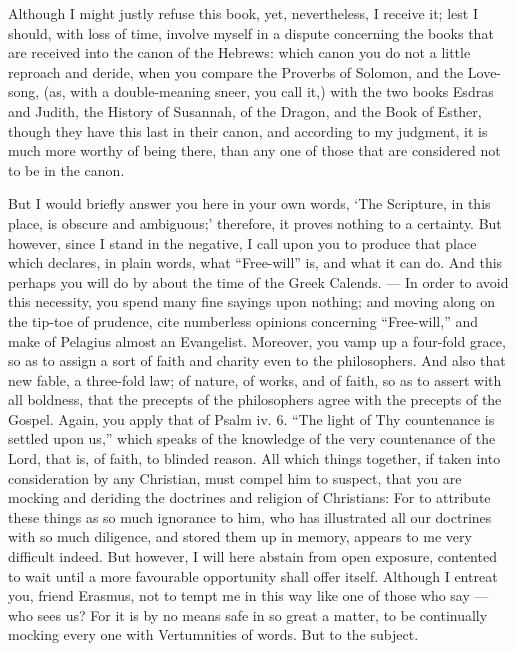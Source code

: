 Although I might justly refuse this book, yet, nevertheless, I receive it; lest I should, with loss of time, involve myself in a dispute concerning the books that are received into the canon of the Hebrews: which canon you do not a little reproach and deride, when you compare the Proverbs of Solomon, and the Love-song, (as, with a double-meaning sneer, you call it,) with the two books Esdras and Judith, the History of Susannah, of the Dragon, and the Book of Esther, though they have this last in their canon, and according to my judgment, it is much more worthy of being there, than any one of those that are considered not to be in the canon.

But I would briefly answer you here in your own words, ‘The Scripture, in this place, is obscure and ambiguous;’ therefore, it proves nothing to a certainty. But however, since I stand in the negative, I call upon you to produce that place which declares, in plain words, what “Free-will” is, and what it can do. And this perhaps you will do by about the time of the Greek Calends. — In order to avoid this necessity, you spend many fine sayings upon nothing; and moving along on the tip-toe of prudence, cite numberless opinions concerning “Free-will,” and make of Pelagius almost an Evangelist. Moreover, you vamp up a four-fold grace, so as to assign a sort of faith and charity even to the philosophers. And also that new fable, a three-fold law; of nature, of works, and of faith, so as to assert with all boldness, that the precepts of the philosophers agree with the precepts of the Gospel. Again, you apply that of Psalm iv. 6. “The light of Thy countenance is settled upon us,” which speaks of the knowledge of the very countenance of the Lord, that is, of faith, to blinded reason. All which things together, if taken into consideration by any Christian, must compel him to suspect, that you are mocking and deriding the doctrines and religion of Christians: For to attribute these things as so much ignorance to him, who has illustrated all our doctrines with so much diligence, and stored them up in memory, appears to me very difficult indeed. But however, I will here abstain from open exposure, contented to wait until a more favourable opportunity shall offer itself. Although I entreat you, friend Erasmus, not to tempt me in this way like one of those who say — who sees us? For it is by no means safe in so great a matter, to be continually mocking every one with Vertumnities of words. But to the subject.


